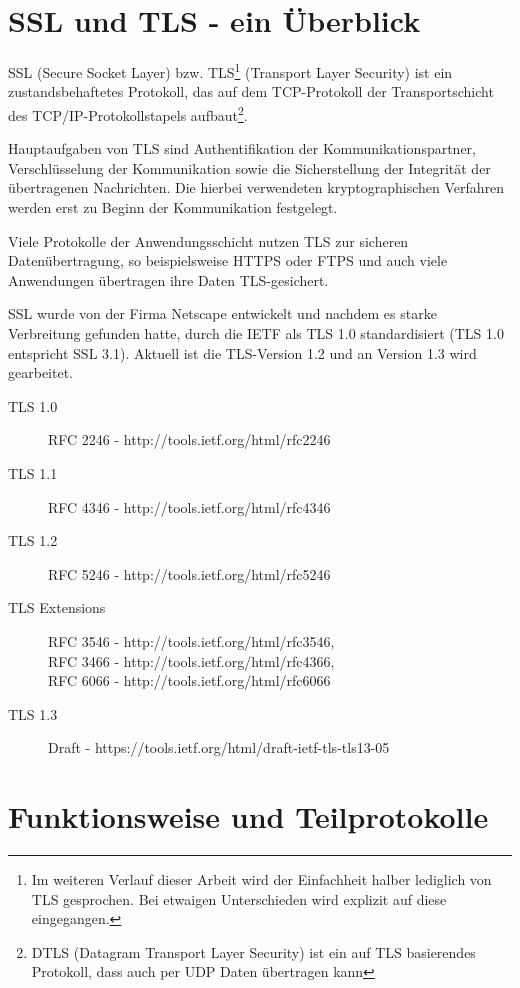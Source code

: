 \documentclass[
    12pt,
    headings=small,
    parskip=half,           %
    bibliography=totoc,
    numbers=noenddot,       %
    open=any,               %
    ]{scrreprt}
\begin{document}
\chapter{SSL und TLS - ein Überblick}

SSL (Secure Socket Layer) bzw. TLS\footnote{Im weiteren Verlauf dieser Arbeit wird der Einfachheit halber lediglich von TLS gesprochen. Bei etwaigen Unterschieden wird explizit auf diese eingegangen.} (Transport Layer Security) ist ein zustandsbehaftetes Protokoll, das auf dem TCP-Protokoll der Transportschicht des TCP/IP-Protokollstapels aufbaut\footnote{DTLS (Datagram Transport Layer Security) ist ein auf TLS basierendes Protokoll, dass auch per UDP Daten übertragen kann}. 

Hauptaufgaben von TLS sind Authentifikation der Kommunikationspartner, Verschlüsselung der Kommunikation sowie die Sicherstellung der Integrität der übertragenen Nachrichten. Die hierbei verwendeten kryptographischen Verfahren werden erst zu Beginn der Kommunikation festgelegt. 

Viele Protokolle der Anwendungsschicht nutzen TLS zur sicheren Datenübertragung, so beispielsweise HTTPS oder FTPS und auch viele Anwendungen übertragen ihre Daten TLS-gesichert.

SSL wurde von der Firma Netscape entwickelt und nachdem es starke Verbreitung gefunden hatte, durch die IETF als TLS 1.0 standardisiert (TLS 1.0 entspricht SSL 3.1). Aktuell ist die TLS-Version 1.2 und an Version 1.3 wird gearbeitet. \cite{schmeh09}

\begin{description}
	\item[TLS 1.0] RFC 2246 - http://tools.ietf.org/html/rfc2246
	\item[TLS 1.1] RFC 4346 - http://tools.ietf.org/html/rfc4346
	\item[TLS 1.2] RFC 5246 - http://tools.ietf.org/html/rfc5246
	\item[TLS Extensions] RFC 3546 - http://tools.ietf.org/html/rfc3546, \\
RFC 3466 - http://tools.ietf.org/html/rfc4366, \\
RFC 6066 - http://tools.ietf.org/html/rfc6066
	\item[TLS 1.3] Draft - https://tools.ietf.org/html/draft-ietf-tls-tls13-05
\end{description}

\chapter{Funktionsweise und Teilprotokolle}
\end{document}

